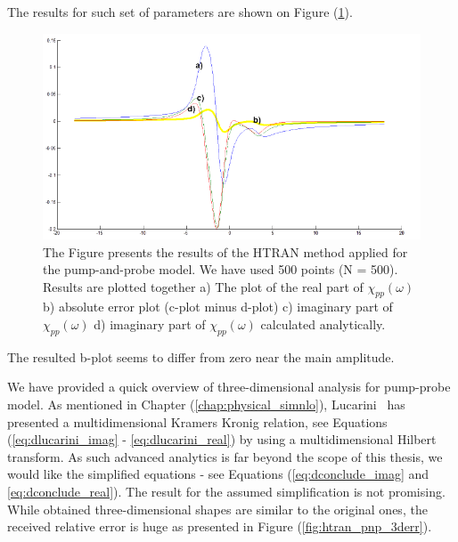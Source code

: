 \documentclass[12pt,twoside,a4paper]{article}
\numberwithin{equation}{subsection}
\numberwithin{figure}{subsection}
\begin{document}
The results for such set of parameters are shown on Figure (\ref{fig:htran_pnp_2d}).

\begin{figure}
  \includegraphics[width=150mm]{img/htran_pnp_2d.png}
  \caption{The Figure presents the results of the HTRAN method applied for the pump-and-probe model. We have used 500 points (N =
  500). Results are plotted together 
    a) The plot of the real part of $\chi_{pp} (\omega )$ 
    b) absolute error plot (c-plot minus d-plot) 
    c) imaginary part of $\chi_{pp} (\omega )$
    d) imaginary part of ${\chi_{pp}}(\omega )$ calculated analytically.
    \label{fig:htran_pnp_2d}}
\end{figure}

The resulted b-plot seems to differ from zero near the main amplitude. 

We have provided a quick overview of three-dimensional analysis for pump-probe model. As mentioned in Chapter (\ref{chap:physical_simnlo}), Lucarini~\cite{lucarini_kramers} has presented a multidimensional Kramers Kronig relation, see Equations (\ref{eq:dlucarini_imag} - \ref{eq:dlucarini_real}) by using a multidimensional Hilbert transform. As such advanced analytics is far beyond the scope of this thesis, we would like the simplified equations - see Equations (\ref{eq:dconclude_imag} and \ref{eq:dconclude_real}). The result for the assumed simplification is not promising. While obtained three-dimensional shapes are similar to the original ones, the received relative error is huge as presented in Figure (\ref{fig:htran_pnp_3derr}). 
\end{document}
